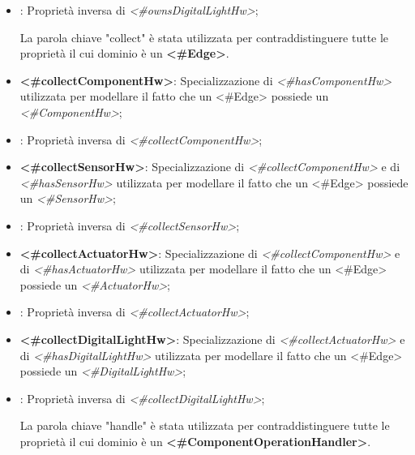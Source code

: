 \begin{itemize}
	\item {}: Proprietà inversa di \textit{<\#ownsDigitalLightHw>};

\begin{info}[collect:]
	La parola chiave "collect" è stata utilizzata per contraddistinguere tutte le proprietà il cui dominio è un \textbf{<\#Edge>}.
\end{info}

	\item \textbf{<\#collectComponentHw>}: Specializzazione di \textit{<\#hasComponentHw>} utilizzata per modellare il fatto che un <#Edge> possiede un \textit{<\#ComponentHw>};

	\item {}: Proprietà inversa di \textit{<\#collectComponentHw>};

	\item \textbf{<\#collectSensorHw>}: Specializzazione di \textit{<\#collectComponentHw>} e di \textit{<\#hasSensorHw>} utilizzata per modellare il fatto che un <#Edge> possiede un \textit{<\#SensorHw>};

	\item {}: Proprietà inversa di \textit{<\#collectSensorHw>};

	\item \textbf{<\#collectActuatorHw>}: Specializzazione di \textit{<\#collectComponentHw>} e di \textit{<\#hasActuatorHw>} utilizzata per modellare il fatto che un <#Edge> possiede un \textit{<\#ActuatorHw>};

	\item {}: Proprietà inversa di \textit{<\#collectActuatorHw>};

	\item \textbf{<\#collectDigitalLightHw>}: Specializzazione di \textit{<\#collectActuatorHw>} e di \textit{<\#hasDigitalLightHw>} utilizzata per modellare il fatto che un <#Edge> possiede un \textit{<\#DigitalLightHw>};

	\item {}: Proprietà inversa di \textit{<\#collectDigitalLightHw>};

\begin{info}[handle:]
	La parola chiave "handle" è stata utilizzata per contraddistinguere tutte le proprietà il cui dominio è un \textbf{<\#ComponentOperationHandler>}.
\end{info}


\end{itemize}
